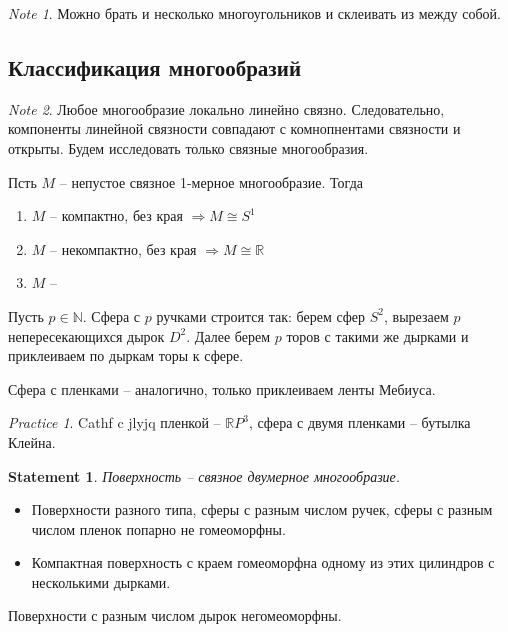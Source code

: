 \documentclass[11pt]{book}
\newcommand{\N}{\mathbb{N}}
\newcommand{\R}{\mathbb{R}}
\theoremstyle{definition}
\theoremstyle{plain}
\theoremstyle{plain}
\newtheorem*{st}{Statement}
\theoremstyle{definition}
\theoremstyle{remark}
\newtheorem*{note}{Note}
\newtheorem*{prac}{Practice}
\begin{document}
\begin{note}
    Можно брать и несколько многоугольников и склеивать из между собой.
\end{note}
\subsection{Классификация многообразий}
\begin{note}
    Любое многообразие локально линейно связно. Следовательно, компоненты линейной связности совпадают с комнопнентами связности и открыты. Будем исследовать только связные многообразия.
\end{note}
\begin{thm}
    Псть $ M $ -- непустое связное 1-мерное многообразие. Тогда 
    \begin{enumerate}
	\item  $ M$ -- компактно, без края $\Longrightarrow   M \cong S^{1}$
	\item $ M$ -- некомпактно, без края $\Longrightarrow   M \cong \R$
	\item  $ M $ -- 
    \end{enumerate}
\end{thm}
\begin{defn}
    Пусть $ p \in  \N$. Сфера с $ p$  ручками строится так:
    берем сфер  $ S^{2}$, вырезаем $ p$ непересекающихся дырок  $ D^{2}$. Далее берем $ p$ торов с такими же дырками и приклеиваем по дыркам торы к сфере.
\end{defn}
\begin{defn}
    Сфера с пленками -- аналогично, только приклеиваем ленты Мебиуса.
\end{defn}
\begin{prac}
    Cathf c jlyjq пленкой -- $ \R P^{3}$, сфера с двумя пленками -- бутылка Клейна.
\end{prac}
\begin{st}
    Поверхность -- связное двумерное многообразие.
\end{st}
\begin{thm}
    \begin{itemize}
        Компактная поверхность без края гомеоморфна сфере или сфере с ручками или сфере с пленками.
    \item Поверхности разного типа, сферы с разным числом ручек, сферы с разным числом пленок попарно не гомеоморфны.
    \item Компактная поверхность с краем гомеоморфна одному из этих цилиндров с несколькими дырками.
    \end{itemize}
	Поверхности с разным числом дырок негомеоморфны.
\end{thm}
\end{document}
